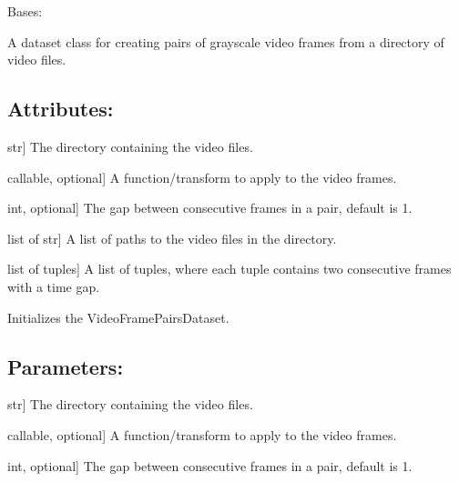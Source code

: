 \documentclass[a4paper,10pt,english]{sphinxmanual}
\begin{document}
\begin{fulllineitems}
\label{\detokenize{datasets:fireDiff.Datasets.pairdataset.VideoFramePairsDataset}}
\pysigstartsignatures
{}
\pysigstopsignatures
\sphinxAtStartPar
Bases: 

\sphinxAtStartPar
A dataset class for creating pairs of grayscale video frames from a
directory of video files.


\subsection{Attributes:}
\label{\detokenize{datasets:attributes}}\begin{description}
\sphinxlineitem{video\_dir}{[}str{]}
\sphinxAtStartPar
The directory containing the video files.

\sphinxlineitem{transform}{[}callable, optional{]}
\sphinxAtStartPar
A function/transform to apply to the video frames.

\sphinxlineitem{timegap}{[}int, optional{]}
\sphinxAtStartPar
The gap between consecutive frames in a pair, default is 1.

\sphinxlineitem{video\_files}{[}list of str{]}
\sphinxAtStartPar
A list of paths to the video files in the directory.

\sphinxlineitem{frame\_pairs}{[}list of tuples{]}
\sphinxAtStartPar
A list of tuples, where each tuple contains two consecutive frames
with a time gap.

\end{description}

\sphinxAtStartPar
Initializes the VideoFramePairsDataset.


\subsection{Parameters:}
\label{\detokenize{datasets:parameters}}\begin{description}
\sphinxlineitem{video\_dir}{[}str{]}
\sphinxAtStartPar
The directory containing the video files.

\sphinxlineitem{transform}{[}callable, optional{]}
\sphinxAtStartPar
A function/transform to apply to the video frames.

\sphinxlineitem{timegap}{[}int, optional{]}
\sphinxAtStartPar
The gap between consecutive frames in a pair, default is 1.

\end{description}

\end{fulllineitems}
\end{document}
